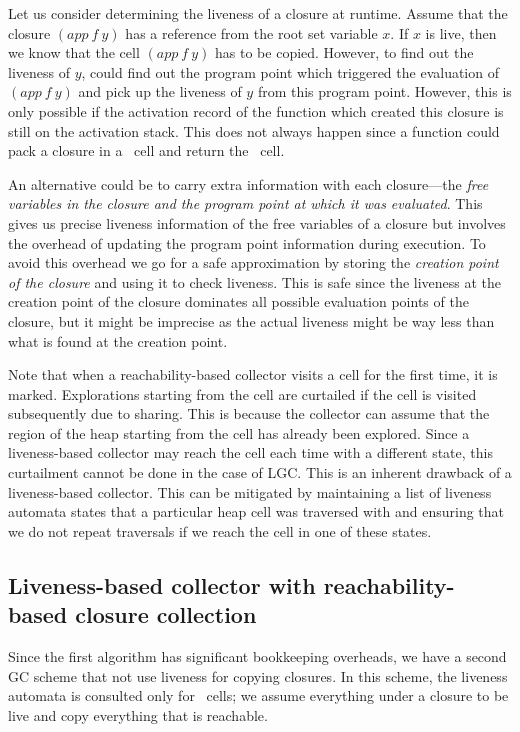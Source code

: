 \documentclass[9pt]{sigplanconf}
\begin{document}
Let   us  consider   determining  the   liveness  of   a   closure  at
runtime. Assume  that the closure  $(app~f~y)$ has a  reference from
the root  set variable $x$. If $x$  is live,  then we  know that the
cell $(app~f~y)$ has  to be copied. However, to find out  the
liveness of $y$, could find out the program point which triggered the
evaluation of $(app~f~y)$ and pick up the liveness of $y$ from this
program point. However, this is only possible if the activation record
of the function which created this closure is still on the activation
stack. This does not always happen since a function could pack a
closure in a \CONS\ cell and return the \CONS\ cell.

An  alternative  could  be   to  carry  extra  information  with  each
closure---the {\em free variables in the closure and the program point
  at  which  it  was  evaluated}.   This  gives  us  precise  liveness
information  of the  free  variables  of a  closure  but involves  the
overhead of  updating the program point  information during execution.
To avoid this  overhead we go for a safe  approximation by storing the
{\em creation  point of the closure}  and using it  to check liveness.
This is safe  since the liveness at the creation  point of the closure
dominates all possible evaluation points  of the closure, but it might
be imprecise  as the actual  liveness might be  way less than  what is
found at the creation point.

Note that  when a reachability-based  collector visits a cell  for the
first time,  it is  marked.  Explorations starting  from the  cell are
curtailed if the cell is  visited subsequently due to sharing. This is
because the collector can assume  that the region of the heap starting
from  the  cell has  already  been  explored.  Since a  liveness-based
collector may  reach the cell each  time with a  different state, this
curtailment cannot  be done in  the case of  LGC. This is  an inherent
drawback  of a  liveness-based collector.   This can  be  mitigated by
maintaining a list of liveness  automata states that a particular heap
cell was traversed with and  ensuring that we do not repeat traversals
if we reach the cell in one of these states.

\subsection{Liveness-based collector with reachability-based closure
  collection}  Since the first  algorithm has  significant bookkeeping
overheads,  we have  a  second GC  scheme  that not  use liveness  for
copying closures.  In this  scheme, the liveness automata is consulted
only for \CONS\ cells; we assume everything under a closure to be live
and copy everything  that is reachable. 
 
\end{document}
